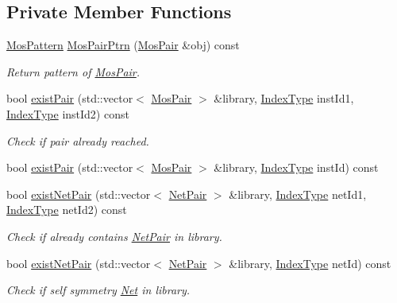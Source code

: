 \subsection*{Private Member Functions}
\begin{DoxyCompactItemize}
\item 
\hyperlink{type_8h_af19eddb079bfea723256710b029c38e8}{Mos\+Pattern} \hyperlink{classSymDetect_aa832e51051f0ed9d3643c72b1d738684}{Mos\+Pair\+Ptrn} (\hyperlink{classMosPair}{Mos\+Pair} \&obj) const
\begin{DoxyCompactList}\small\item\em Return pattern of \hyperlink{classMosPair}{Mos\+Pair}. \end{DoxyCompactList}\item 
bool \hyperlink{classSymDetect_a245b48760c705d4ad9b2bad39012030e}{exist\+Pair} (std\+::vector$<$ \hyperlink{classMosPair}{Mos\+Pair} $>$ \&library, \hyperlink{type_8h_a581e8093e28e7362f2b6937296190676}{Index\+Type} inst\+Id1, \hyperlink{type_8h_a581e8093e28e7362f2b6937296190676}{Index\+Type} inst\+Id2) const
\begin{DoxyCompactList}\small\item\em Check if pair already reached. \end{DoxyCompactList}\item 
bool \hyperlink{classSymDetect_a72b24ce0ad3992c207f5023250dd1d5a}{exist\+Pair} (std\+::vector$<$ \hyperlink{classMosPair}{Mos\+Pair} $>$ \&library, \hyperlink{type_8h_a581e8093e28e7362f2b6937296190676}{Index\+Type} inst\+Id) const
\item 
bool \hyperlink{classSymDetect_a0e73f6d9d0b83b0c42c569fc42f8ecd2}{exist\+Net\+Pair} (std\+::vector$<$ \hyperlink{classNetPair}{Net\+Pair} $>$ \&library, \hyperlink{type_8h_a581e8093e28e7362f2b6937296190676}{Index\+Type} net\+Id1, \hyperlink{type_8h_a581e8093e28e7362f2b6937296190676}{Index\+Type} net\+Id2) const
\begin{DoxyCompactList}\small\item\em Check if already contains \hyperlink{classNetPair}{Net\+Pair} in library. \end{DoxyCompactList}\item 
bool \hyperlink{classSymDetect_a04b449b545fe7d175e4733b3f602c41c}{exist\+Net\+Pair} (std\+::vector$<$ \hyperlink{classNetPair}{Net\+Pair} $>$ \&library, \hyperlink{type_8h_a581e8093e28e7362f2b6937296190676}{Index\+Type} net\+Id) const
\begin{DoxyCompactList}\small\item\em Check if self symmetry \hyperlink{classNet}{Net} in library. \end{DoxyCompactList}\item 

\end{DoxyCompactItemize}
